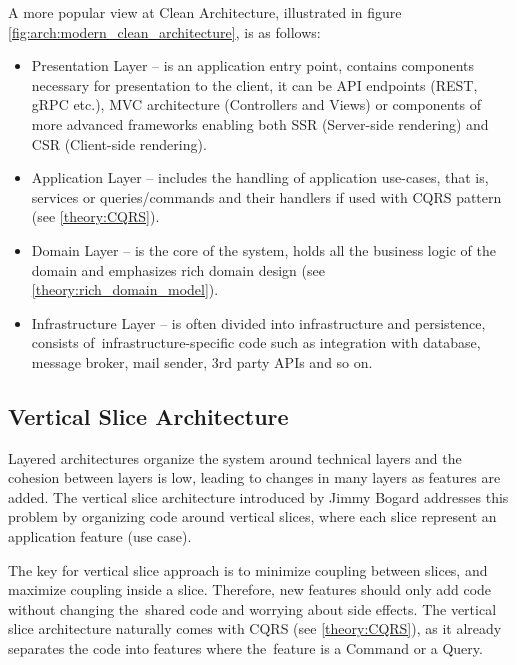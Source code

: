 A more popular view at Clean Architecture, illustrated in figure \ref{fig:arch:modern_clean_architecture}, is as follows:
\begin{itemize}
    \item Presentation Layer -- is an application entry point, contains components necessary for presentation to the client, it can be API endpoints (REST, gRPC etc.), MVC architecture (Controllers and Views) or components of more advanced frameworks enabling both SSR (Server-side rendering) and CSR (Client-side rendering).
    
    \item Application Layer -- includes the handling of application use-cases, that is, services or queries/commands and their handlers if used with CQRS pattern (see \ref{theory:CQRS}).
    
    \item Domain Layer -- is the core of the system, holds all the business logic of the domain and emphasizes rich domain design (see \ref{theory:rich_domain_model}).
    
    \item Infrastructure Layer -- is often divided into infrastructure and persistence, consists of~infrastructure-specific code such as integration with database, message broker, mail sender, 3rd party APIs and so on.
\end{itemize}

\subsection{Vertical Slice Architecture}
\label{theory:vertical_slice_architecture}
Layered architectures organize the system around technical layers and the cohesion between layers is low, leading to changes in many layers as features are added. The vertical slice architecture introduced by Jimmy Bogard \cite{jimmy_bogard:vertical_slice_architecture} addresses this problem by organizing code around vertical slices, where each slice represent an application feature (use case). 

The key for vertical slice approach is to minimize coupling between slices, and maximize coupling inside a slice. Therefore, new features should only add code without changing the~shared code and worrying about side effects. The vertical slice architecture naturally comes with CQRS (see \ref{theory:CQRS}), as it already separates the code into features where the~feature is a Command or a Query. 

